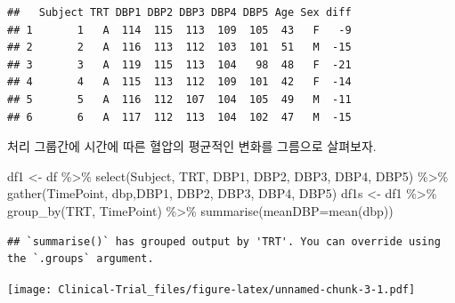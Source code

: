 \documentclass[
]{book}
\newenvironment{Shaded}{\begin{snugshade}}{\end{snugshade}}
\newcommand{\AttributeTok}[1]{\textcolor[rgb]{0.77,0.63,0.00}{#1}}
\newcommand{\DecValTok}[1]{\textcolor[rgb]{0.00,0.00,0.81}{#1}}
\newcommand{\FunctionTok}[1]{\textcolor[rgb]{0.00,0.00,0.00}{#1}}
\newcommand{\NormalTok}[1]{#1}
\newcommand{\OtherTok}[1]{\textcolor[rgb]{0.56,0.35,0.01}{#1}}
\newcommand{\SpecialCharTok}[1]{\textcolor[rgb]{0.00,0.00,0.00}{#1}}
\begin{document}
\begin{verbatim}
##   Subject TRT DBP1 DBP2 DBP3 DBP4 DBP5 Age Sex diff
## 1       1   A  114  115  113  109  105  43   F   -9
## 2       2   A  116  113  112  103  101  51   M  -15
## 3       3   A  119  115  113  104   98  48   F  -21
## 4       4   A  115  113  112  109  101  42   F  -14
## 5       5   A  116  112  107  104  105  49   M  -11
## 6       6   A  117  112  113  104  102  47   M  -15
\end{verbatim}

처리 그룹간에 시간에 따른 혈압의 평균적인 변화를 그름으로 살펴보자.

\begin{Shaded}
\begin{Highlighting}[]
\NormalTok{df1 }\OtherTok{\textless{}{-}}\NormalTok{ df }\SpecialCharTok{\%\textgreater{}\%} \FunctionTok{select}\NormalTok{(Subject, TRT, DBP1, DBP2, DBP3, DBP4, DBP5) }\SpecialCharTok{\%\textgreater{}\%} \FunctionTok{gather}\NormalTok{(TimePoint, dbp,DBP1, DBP2, DBP3, DBP4, DBP5)}
\NormalTok{df1s }\OtherTok{\textless{}{-}}\NormalTok{ df1 }\SpecialCharTok{\%\textgreater{}\%} \FunctionTok{group\_by}\NormalTok{(TRT, TimePoint)  }\SpecialCharTok{\%\textgreater{}\%}  \FunctionTok{summarise}\NormalTok{(}\AttributeTok{meanDBP=}\FunctionTok{mean}\NormalTok{(dbp))}
\end{Highlighting}
\end{Shaded}

\begin{verbatim}
## `summarise()` has grouped output by 'TRT'. You can override using the `.groups` argument.
\end{verbatim}

\begin{Shaded}
\end{Shaded}

\texttt{[image: Clinical-Trial\_files/figure-latex/unnamed-chunk-3-1.pdf]}
\end{document}
